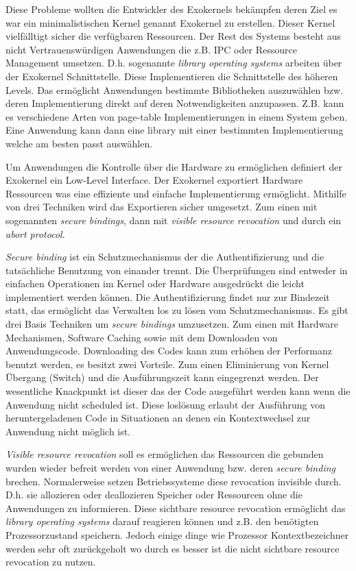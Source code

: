 \documentclass[9pt,technote]{IEEEtran}
\begin{document}
        Diese Probleme wollten die Entwickler des Exokernels bek\"ampfen deren Ziel es war ein minimalistischen Kernel genannt Exokernel zu erstellen.
        Dieser Kernel vielf\"alltigt sicher die verf\"ugbaren Ressourcen. Der Rest des Systems besteht aus nicht Vertrauensw\"urdigen Anwendungen die
        z.B. IPC oder Ressource Management umsetzen. D.h. sogenannte \textit{library operating systems} arbeiten \"uber der Exokernel Schnittstelle. 
        Diese Implementieren die Schnittstelle des h\"oheren Levels. Das erm\"oglicht Anwendungen bestimmte Bibliotheken auszuw\"ahlen bzw.
        deren Implementierung direkt auf deren Notwendigkeiten anzupassen. Z.B. kann es verschiedene Arten von page-table Implementierungen
        in einem System geben. Eine Anwendung kann dann eine library mit einer bestimmten Implementierung welche am besten passt ausw\"ahlen.
        
        Um Anwendungen die Kontrolle \"uber die Hardware zu erm\"oglichen definiert der Exokernel ein Low-Level Interface.
        Der Exokernel exportiert Hardware Ressourcen was eine effiziente und einfache Implementierung erm\"oglicht.
        Mithilfe von drei Techniken wird das Exportieren sicher umgesetzt. Zum einen mit sogenannten \textit{secure bindings}, 
        dann mit \textit{visible resource revocation} und durch ein \textit{abort protocol}. 
        
        \textit{Secure binding} ist ein Schutzmechanismus der die Authentifizierung und die tats\"achliche Benutzung von einander trennt.
        Die \"Uberpr\"ufungen sind entweder in einfachen Operationen im Kernel oder Hardware ausgedr\"uckt die leicht implementiert werden k\"onnen.
        Die Authentifizierung findet nur zur Bindezeit statt, das erm\"oglicht das Verwalten los zu l\"osen vom Schutzmechanismus. Es gibt drei Basis Techniken
        um \textit{secure bindings} umzusetzen. Zum einen mit Hardware Mechanismen, Software Caching sowie mit dem Downloaden von Anwendungscode.
        Downloading des Codes kann zum erh\"ohen der Performanz benutzt werden, es besitzt zwei Vorteile. Zum einen Eliminierung von Kernel \"Ubergang (Switch)
        und die Ausf\"uhrungszeit kann eingegrenzt werden. Der wesentliche Knackpunkt ist dieser das der Code ausgef\"uhrt werden kann wenn die Anwendung nicht
        scheduled ist. 
        Diese losl\"osung erlaubt der Ausf\"uhrung von heruntergeladenen Code in Situationen an denen ein Kontextwechsel zur Anwendung nicht m\"oglich ist.
        
        \textit{Visible resource revocation} soll es erm\"oglichen das Ressourcen die gebunden wurden wieder befreit werden von einer Anwendung 
        bzw. deren \textit{secure binding} brechen.
        Normalerweise setzen Betriebssysteme diese revocation invisible durch. 
        D.h. sie allozieren oder deallozieren Speicher oder Ressourcen ohne die Anwendungen zu informieren.
        Diese sichtbare resource revocation erm\"oglicht das \textit{library operating systems} darauf reagieren k\"onnen und
        z.B. den ben\"otigten Prozessorzustand speichern.
        Jedoch einige dinge wie Prozessor Kontextbezeichner werden sehr oft zur\"uckgeholt wo durch es besser ist die nicht sichtbare 
        resource revocation zu nutzen.
        
\end{document}
